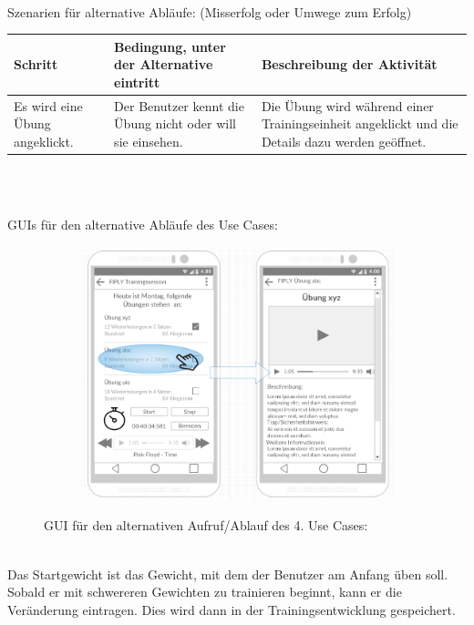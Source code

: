 \documentclass[FIPLY_base.tex]{subfiles}
\begin{document}
	\ \\
	Szenarien für alternative Abläufe: (Misserfolg oder Umwege zum Erfolg)
	\ \\
	\begin{center}	
		\def\arraystretch{1.3}%
		\begin{tabular}{| p{3cm} | p{3cm} | p{6cm} |}
			\hline
			\textbf{Schritt} & \textbf{Bedingung, unter der Alternative eintritt} & \textbf{Beschreibung der Aktivität}  \\ \hline 
			Es wird eine Übung angeklickt. & Der Benutzer kennt die Übung nicht oder will sie einsehen. & Die Übung wird während einer Trainingseinheit angeklickt und die Details dazu werden geöffnet.\\ \hline
		\end{tabular} \\
	\end{center}
	\ \\
	GUIs für  den alternative Abläufe des Use Cases:
	\ \\
	\begin{figure}[H]
		\begin{subfigure}[b]{0.3\textwidth}
			\includegraphics[scale=0.32]{img/Trainingssessionalternativ}
		\end{subfigure}
		\caption{GUI für den alternativen Aufruf/Ablauf des 4. Use Cases:}
	\end{figure}
	\ \\
	Das Startgewicht ist das Gewicht, mit dem der Benutzer am Anfang üben soll. Sobald  er mit schwereren Gewichten zu trainieren beginnt, kann er die Veränderung eintragen. Dies wird dann in der Trainingsentwicklung gespeichert. 
	
\end{document}
